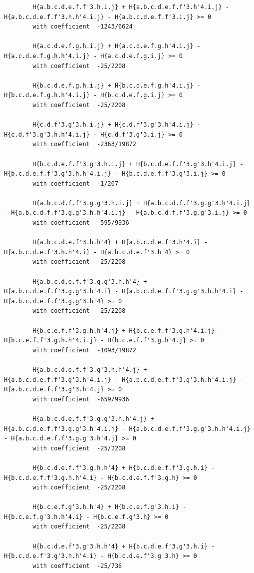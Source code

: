 \documentclass[11pt, a4paper]{kybernetika}
\begin{document}
\begin{verbatim}
		H{a.b.c.d.e.f.f'3.h.i.j} + H{a.b.c.d.e.f.f'3.h'4.i.j} - H{a.b.c.d.e.f.f'3.h.h'4.i.j} - H{a.b.c.d.e.f.f'3.i.j} >= 0
		with coefficient  -1243/6624
		
		H{a.c.d.e.f.g.h.i.j} + H{a.c.d.e.f.g.h'4.i.j} - H{a.c.d.e.f.g.h.h'4.i.j} - H{a.c.d.e.f.g.i.j} >= 0
		with coefficient  -25/2208
		
		H{b.c.d.e.f.g.h.i.j} + H{b.c.d.e.f.g.h'4.i.j} - H{b.c.d.e.f.g.h.h'4.i.j} - H{b.c.d.e.f.g.i.j} >= 0
		with coefficient  -25/2208
		
		H{c.d.f'3.g'3.h.i.j} + H{c.d.f'3.g'3.h'4.i.j} - H{c.d.f'3.g'3.h.h'4.i.j} - H{c.d.f'3.g'3.i.j} >= 0
		with coefficient  -2363/19872
		
		H{b.c.d.e.f.f'3.g'3.h.i.j} + H{b.c.d.e.f.f'3.g'3.h'4.i.j} - H{b.c.d.e.f.f'3.g'3.h.h'4.i.j} - H{b.c.d.e.f.f'3.g'3.i.j} >= 0
		with coefficient  -1/207
		
		H{a.b.c.d.f.f'3.g.g'3.h.i.j} + H{a.b.c.d.f.f'3.g.g'3.h'4.i.j} - H{a.b.c.d.f.f'3.g.g'3.h.h'4.i.j} - H{a.b.c.d.f.f'3.g.g'3.i.j} >= 0
		with coefficient  -595/9936
		
		H{a.b.c.d.e.f'3.h.h'4} + H{a.b.c.d.e.f'3.h'4.i} - H{a.b.c.d.e.f'3.h.h'4.i} - H{a.b.c.d.e.f'3.h'4} >= 0
		with coefficient  -25/2208
		
		H{a.b.c.d.e.f.f'3.g.g'3.h.h'4} + H{a.b.c.d.e.f.f'3.g.g'3.h'4.i} - H{a.b.c.d.e.f.f'3.g.g'3.h.h'4.i} - H{a.b.c.d.e.f.f'3.g.g'3.h'4} >= 0
		with coefficient  -25/2208
		
		H{b.c.e.f.f'3.g.h.h'4.j} + H{b.c.e.f.f'3.g.h'4.i.j} - H{b.c.e.f.f'3.g.h.h'4.i.j} - H{b.c.e.f.f'3.g.h'4.j} >= 0
		with coefficient  -1093/19872
		
		H{a.b.c.d.e.f.f'3.g'3.h.h'4.j} + H{a.b.c.d.e.f.f'3.g'3.h'4.i.j} - H{a.b.c.d.e.f.f'3.g'3.h.h'4.i.j} - H{a.b.c.d.e.f.f'3.g'3.h'4.j} >= 0
		with coefficient  -659/9936
		
		H{a.b.c.d.e.f.f'3.g.g'3.h.h'4.j} + H{a.b.c.d.e.f.f'3.g.g'3.h'4.i.j} - H{a.b.c.d.e.f.f'3.g.g'3.h.h'4.i.j} - H{a.b.c.d.e.f.f'3.g.g'3.h'4.j} >= 0
		with coefficient  -25/2208
		
		H{b.c.d.e.f.f'3.g.h.h'4} + H{b.c.d.e.f.f'3.g.h.i} - H{b.c.d.e.f.f'3.g.h.h'4.i} - H{b.c.d.e.f.f'3.g.h} >= 0
		with coefficient  -25/2208
		
		H{b.c.e.f.g'3.h.h'4} + H{b.c.e.f.g'3.h.i} - H{b.c.e.f.g'3.h.h'4.i} - H{b.c.e.f.g'3.h} >= 0
		with coefficient  -25/2208
		
		H{b.c.d.e.f'3.g'3.h.h'4} + H{b.c.d.e.f'3.g'3.h.i} - H{b.c.d.e.f'3.g'3.h.h'4.i} - H{b.c.d.e.f'3.g'3.h} >= 0
		with coefficient  -25/736
		

\end{verbatim}
\end{document}
